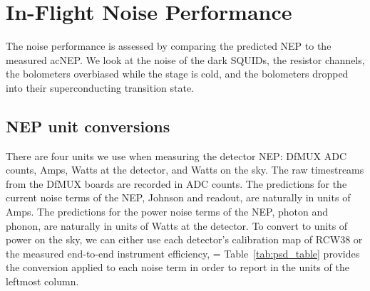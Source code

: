 


\section{In-Flight Noise Performance}
\label{sec:flight_noise_performance}

The noise performance is assessed by comparing the predicted \ac{NEP} to the measured ac{NEP}. 
We look at the noise of the dark \ac{SQUID}s, the resistor channels, the bolometers overbiased while the stage is cold, and the bolometers dropped into their superconducting transition state. 

\subsection{NEP unit conversions}
\label{sec:nep_units}

There are four units we use when measuring the detector \ac{NEP}: \ac{DfMUX} \ac{ADC} counts, Amps, Watts at the detector, and Watts on the sky. 
The raw timestreams from the \ac{DfMUX} boards are recorded in \ac{ADC} counts. 
The predictions for the current noise terms of the \ac{NEP}, Johnson and readout, are naturally in units of Amps.
The predictions for the power noise terms of the \ac{NEP}, photon and phonon, are naturally in units of Watts at the detector. 
To convert to units of power on the sky, we can either use each detector's calibration map of RCW38 or the measured end-to-end instrument efficiency, 
\be
\varepsilon = 
\label{eq:eff_ratio}
\ee
Table~\ref{tab:psd_table} provides the conversion applied to each noise term in order to report in the units of the leftmost column. 


